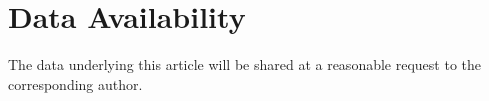\documentclass[a4paper,useAMS,usenatbib]{mnras}
\begin{document}
 
 \section*{Data Availability}
The data underlying this article will be shared at a reasonable request to the corresponding author. 
\vspace{-0.5cm}


\label{lastpage}
\end{document}
